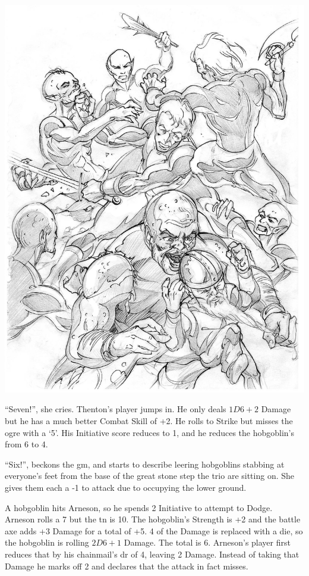 \begin{multicols}{2}
{\begin{exampletext}
	\noindent\includegraphics[width=\linewidth]{images/Boris_Pecikozic/nura_brawl.jpg}
	\label{boris:brawl}

	``Seven!'', she cries. Thenton's player jumps in. He only deals $1D6+2$ Damage but he has a much better Combat Skill of +2. He rolls to Strike but misses the ogre with a `5'. His Initiative score reduces to 1, and he reduces the hobgoblin's from 6 to 4.

	``Six!'', beckons the \gls{gm}, and starts to describe leering hobgoblins stabbing at everyone's feet from the base of the great stone step the trio are sitting on. She gives them each a -1 to attack due to occupying the lower ground.

	A hobgoblin hits Arneson, so he spends 2 Initiative to attempt to Dodge. Arneson rolls a 7 but the \gls{tn} is 10.
	The hobgoblin's Strength is +2 and the battle axe adds +3 Damage for a total of +5.
	4 of the Damage is replaced with a die, so the hobgoblin is rolling $2D6+1$ Damage.
	The total is 6.
	Arneson's player first reduces that by his chainmail's \gls{dr} of 4, leaving 2 Damage.
	Instead of taking that Damage he marks off 2  and declares that the attack in fact misses.


\end{exampletext}}
\end{multicols}
